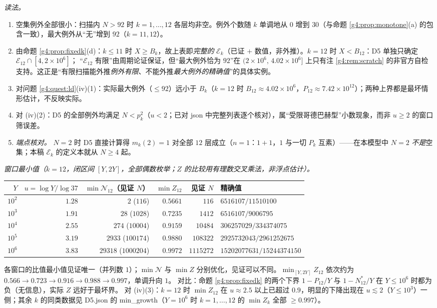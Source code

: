 \documentclass[11pt,a4paper]{article}
\newcommand{\Cnt}{\mathcal N}          %
\newcommand{\Exc}{\mathcal E}          %
\theoremstyle{plain}
\theoremstyle{definition}
\begin{document}
\begin{CJK}{UTF8}{gbsn}
\emph{读法。}
\begin{enumerate}[label=(\arabic*)]
\item 空集例外全部很小：扫描内 $N>92$ 时 $k=1,\dots,12$ 各层均非空。例外个数随 $k$ 单调地从 $0$ 增到 $30$（与命题 \ref{g4:prop:monotone}(a) 的包含一致），最大例外从“无”增到 $92$（$k=11,12$）。
\item 由命题 \ref{g4:prop:fixedk}(d)：$k\le11$ 时 $X\ge B_k$，故上表即\emph{完整的} $\Exc_k$（已证 $+$ 数值，非外推）。$k=12$ 时 $X<B_{12}$：D5 单独只确定 $\Exc_{12}\cap[4,2\times10^6]$；
“$\Exc_{12}$ 有限”由周期论证保证，但“最大例外恰为 $92$”在 $(2\times10^6,\,4.02\times10^6]$ 上只有注 \ref{g4:rem:scratch} 的非官方自检支持。这正是“有限扫描能外推\emph{例外有限}、不能外推\emph{最大例外的精确值}”的具体实例。
\item 对问题 \ref{g4:quest:ld}(iv)(1)：实际最大例外（$\le92$）远小于 $B_k$（$k=12$ 时 $B_{12}\approx4.02\times10^6$，$P_{12}\approx7.42\times10^{12}$）；两种上界都是最坏情形估计，不反映实际。
\item 对 (iv)(2)：D5 的全部例外均满足 $N<p_k^2$（$u<2$；已对 json 中完整列表逐个核对），属“受限哥德巴赫型”小数现象，而非 $u\ge2$ 的窗口筛误差。
\item \emph{端点核对。} $N=2$ 时 D5 直接计算得 $m_k(2)=1$ 对全部 $12$ 层成立（$n=1$：$1+1$，$1$ 与一切 $P_k$ 互素）——在本模型中 $N=2$ \emph{不是}空集；本稿 $\Exc_k$ 的定义本就从 $N\ge4$ 起。
\end{enumerate}

\emph{窗口最小值（$k=12$，闭区间 $[Y,2Y]$，全部偶数枚举；$Z$ 的比较用有理数交叉乘法，非浮点估计）。}
\begin{center}
\small
\begin{tabular}{rrrrrl}
\hline
$Y$ & $u=\log Y/\log37$ & $\min\Cnt_{12}$（见证 $N$） & $\min Z_{12}$ & 见证 $N$ & 精确值\\
\hline
$10^2$ & $1.28$ & $2$ ($116$) & $0.5661$ & $116$ & $6516107/11510100$\\
$10^3$ & $1.91$ & $28$ ($1028$) & $0.7235$ & $1412$ & $6516107/9006795$\\
$10^4$ & $2.55$ & $274$ ($10004$) & $0.9159$ & $10484$ & $306257029/334374075$\\
$10^5$ & $3.19$ & $2933$ ($100174$) & $0.9880$ & $108322$ & $2925732043/2961252675$\\
$10^6$ & $3.83$ & $29318$ ($1000204$) & $0.9972$ & $1115272$ & $15202077631/15244374150$\\
\hline
\end{tabular}
\end{center}
各窗口的比值最小值见证唯一（并列数 $1$）；$\min\Cnt$ 与 $\min Z$ 分别优化，见证可以不同。$\min_{[Y,2Y]}Z_{12}$ 依次约为 $0.566\to0.723\to0.916\to0.988\to0.997$，单调升向 $1$。
对比：命题 \ref{g4:prop:fixedk} 的两个下界 $1-P_{12}/Y$ 与 $1-N_{12}^*/Y$ 在 $Y\le10^6$ 时都为负（无信息），实际 $Z$ 远好于最坏界。
对 (iv)(3)：$k=12$ 时 $\min Z_{12}$ 在 $u\approx2.5$ 以上已超过 $0.9$，明显的下降出现在 $u\lesssim2$（$Y\le10^3$）一侧；其余 $k$ 的同类数据见 D5.json 的 min\_growth（$Y=10^6$ 时 $k=1,\dots,12$ 的 $\min Z_k$ 全部 $\ge0.997$）。


\end{CJK}
\end{document}
